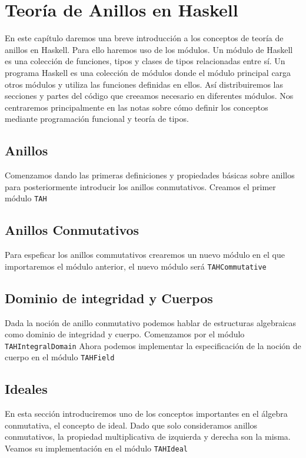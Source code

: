 \chapter{Teoría de Anillos en Haskell}
En este capítulo daremos una breve introducción a los conceptos de teoría de anillos en Haskell. Para ello haremos uso de los módulos. Un módulo de Haskell es una colección de funciones, tipos y clases de tipos relacionadas entre sí. Un programa Haskell es una colección de módulos donde el módulo principal carga otros módulos y utiliza las funciones definidas en ellos. Así distribuiremos las secciones y partes del código que creeamos necesario en diferentes módulos. Nos centraremos principalmente en las notas sobre cómo definir los conceptos mediante programación funcional y teoría de tipos.

\section{Anillos}
Comenzamos dando las primeras definiciones y propiedades básicas sobre anillos para posteriormente introducir los anillos conmutativos. Creamos el primer módulo \texttt{TAH}

\section{Anillos Conmutativos}
Para espeficar los anillos commutativos crearemos un nuevo módulo en el que importaremos el módulo anterior, el nuevo módulo será \texttt{TAHCommutative}
\section{Dominio de integridad y Cuerpos}
Dada la noción de anillo conmutativo podemos hablar de estructuras algebraicas como dominio de integridad y cuerpo. Comenzamos por el módulo \texttt{TAHIntegralDomain} Ahora podemos implementar la especificación de la noción de cuerpo en el módulo \texttt{TAHField}

\section{Ideales}
En esta sección introduciremos uno de los conceptos importantes en el álgebra conmutativa, el concepto de ideal. Dado que solo consideramos anillos conmutativos, la propiedad multiplicativa de izquierda y derecha son la misma. Veamos su implementación en el módulo \texttt{TAHIdeal}



